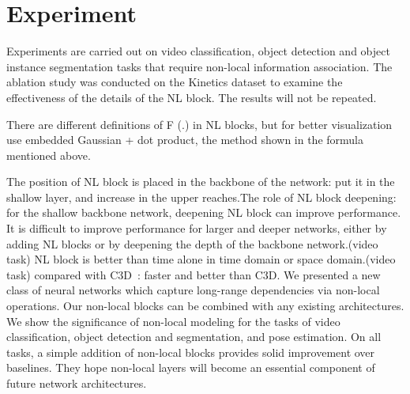 \documentclass[10pt,twocolumn,letterpaper]{article}
\begin{document}
\section{Experiment}
Experiments are carried out on video classification, object detection and object instance segmentation tasks that require non-local information association. The ablation study was conducted on the Kinetics dataset to examine the effectiveness of the details of the NL block. The results will not be repeated. \cite{name28}
\par There are different definitions of F (.) in NL blocks, but for better visualization use embedded Gaussian + dot product, the method shown in the formula mentioned above.
\par The position of NL block is placed in the backbone of the network: put it in the shallow layer, and increase in the upper reaches.The role of NL block deepening: for the shallow backbone network, deepening NL block can improve performance. It is difficult to improve performance for larger and deeper networks, either by adding NL blocks or by deepening the depth of the backbone network.(video task) NL block is better than time alone in time domain or space domain.(video task) compared with C3D~\cite{name13}: faster and better than C3D. We presented a new class of neural networks which capture long-range dependencies via non-local operations. Our non-local blocks can be combined with any existing architectures. We show the significance of non-local modeling for the tasks of video classification, object detection and segmentation, and pose estimation. On all tasks, a simple addition of non-local blocks provides solid improvement over baselines. They hope non-local layers will become an essential component of future network architectures.


\end{document}
